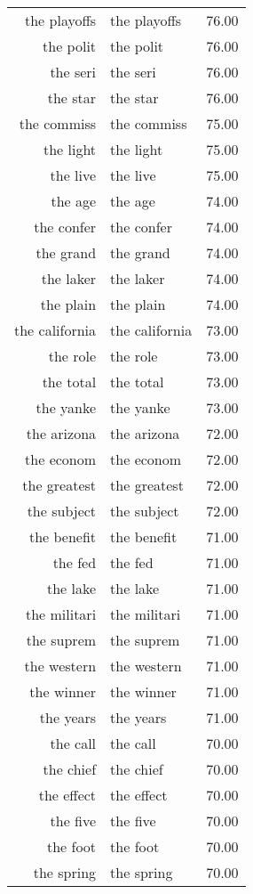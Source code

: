 \begin{table}[ht]
\begin{tabular}{rlr}
  the playoffs & the playoffs & 76.00 \\ 
  the polit & the polit & 76.00 \\ 
  the seri & the seri & 76.00 \\ 
  the star & the star & 76.00 \\ 
  the commiss & the commiss & 75.00 \\ 
  the light & the light & 75.00 \\ 
  the live & the live & 75.00 \\ 
  the age & the age & 74.00 \\ 
  the confer & the confer & 74.00 \\ 
  the grand & the grand & 74.00 \\ 
  the laker & the laker & 74.00 \\ 
  the plain & the plain & 74.00 \\ 
  the california & the california & 73.00 \\ 
  the role & the role & 73.00 \\ 
  the total & the total & 73.00 \\ 
  the yanke & the yanke & 73.00 \\ 
  the arizona & the arizona & 72.00 \\ 
  the econom & the econom & 72.00 \\ 
  the greatest & the greatest & 72.00 \\ 
  the subject & the subject & 72.00 \\ 
  the benefit & the benefit & 71.00 \\ 
  the fed & the fed & 71.00 \\ 
  the lake & the lake & 71.00 \\ 
  the militari & the militari & 71.00 \\ 
  the suprem & the suprem & 71.00 \\ 
  the western & the western & 71.00 \\ 
  the winner & the winner & 71.00 \\ 
  the years & the years & 71.00 \\ 
  the call & the call & 70.00 \\ 
  the chief & the chief & 70.00 \\ 
  the effect & the effect & 70.00 \\ 
  the five & the five & 70.00 \\ 
  the foot & the foot & 70.00 \\ 
  the spring & the spring & 70.00 \\ 

\end{tabular}
\end{table}
